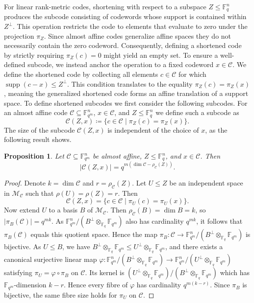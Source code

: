 \documentclass[a4paper,11pt,reqno]{article}
\newcommand{\F}{\mathbb{F}}
\newcommand{\M}{\mathcal{M}}
\newcommand{\supp}{\operatorname{supp}}
\newcommand{\C}{\mathcal{C}}
\theoremstyle{plain} \numberwithin{equation}{section}
\newtheorem{proposition}[theorem]{Proposition}
\theoremstyle{definition}
\renewcommand{\phi}{\varphi}
\begin{document}
For linear rank-metric codes, shortening with respect to a subspace $Z\leq \F_q^n$ produces the subcode consisting of codewords whose support is contained within $Z^\perp$. This operation restricts the code to elements that evaluate to zero under the projection $\pi_Z$. Since almost affine codes generalize affine spaces they do not necessarily contain the zero codeword. Consequently, defining a shortened code by strictly requiring $\pi_Z(c)=0$ might yield an empty set. To ensure a well-defined subcode, we instead anchor the operation to a fixed codeword $x\in \C$. We define the shortened code by collecting all elements $c\in \C$ for which $\supp(c-x)\leq Z^\perp$. This condition translates to the equality $\pi_Z(c) = \pi_Z(x)$, meaning the generalized shortened code forms an affine translation of a support space. To define shortened subcodes we first consider the following subcodes. For an almost affine code $\C\subseteq \F_{q^m}^n$, $x\in \C$, and $Z\leq \F_q^n$ we define such a subcode as
\[
    \C(Z,x) \coloneqq \{ c\in \C\mid \pi_Z(c)=\pi_Z(x)\}.
\]
The size of the subcode $\C(Z,x)$ is independent of the choice of $x$, as the following result shows.
\begin{proposition}\label{prop:shortenedsize}
Let $\C\subseteq \F_{q^m}^n$ be almost affine, $Z\leq \F_q^n$, and $x\in \C$. Then $$|\C(Z,x)|=q^{m(\dim \C - \rho_\C(Z))}.$$ 
\end{proposition}
\begin{proof}
Denote $k= \dim \C$ and $r = \rho_\C(Z)$. Let $U\leq Z$ be an independent space in $\M_\C$ such that $\rho(U) = \rho(Z)=r$. Then
\[
    \C(Z,x) = \{c\in \C \mid \pi_U(c) =\pi_U(x)\}.
\]
Now extend $U$ to a basis $B$ of $\M_\C$. Then $\rho_\C(B) = \dim B = k$, so $|\pi_B(\C)| = q^{mk}$. As $\F_{q^m}^n/(B^\perp \otimes_{\F_q}\F_{q^m})$ also has cardinality $q^{mk}$, it follows that $\pi_B(\C)$ equals this quotient space. Hence the map $\pi_B \colon \C \rightarrow \F_{q^m}^n/(B^\perp \otimes_{\F_q}\F_{q^m})$ is bijective. As $U\leq B$, we have $B^\perp \otimes_{\F_q}\F_{q^m}\leq U^\perp \otimes_{\F_q}\F_{q^m}$, and there exists a canonical surjective linear map $\phi\colon \F_{q^m}^n/(B^\perp \otimes_{\F_q}\F_{q^m})\rightarrow \F_{q^m}^n/(U^\perp\otimes_{\F_q}\F_{q^m})$ satisfying $\pi_U = \phi \circ \pi_B$ on $\C$. Its kernel is $(U^\perp \otimes_{\F_q}\F_{q^m})/(B^\perp\otimes_{\F_q}\F_{q^m})$ which has $\F_{q^m}$-dimension $k-r$. Hence every fibre of $\phi$ has cardinality $q^{m(k-r)}$. Since $\pi_B$ is bijective, the same fibre size holds for $\pi_U$ on $\C$.
\end{proof}
\end{document}
